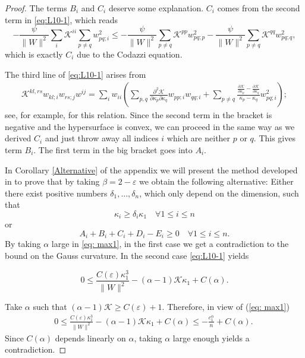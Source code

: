 \documentclass{amsart}
\theoremstyle{definition}
\theoremstyle{remark}
\newtheorem{remark}[theorem]{Remark}
\numberwithin{equation}{section}
\begin{document}
\begin{proof}
The terms $B_i$ and $C_i$ deserve some explanation. $C_i$ comes from the second term in \eqref{eq:L10-1}, which reads
\[-\frac{\psi}{\|W\|^2}\sum_i\mathcal{K}^{ii}\sum_{p\neq q}w_{pq;i}^2\leq -\frac{\psi}{\|W\|^2}\sum_{p\neq q}\mathcal{K}^{pp}w_{pq;p}^2-\frac{\psi}{\|W\|^2}\sum_{p\neq q}\mathcal{K}^{qq}w_{pq;q}^2, \]
which is exactly $C_i$ due to the Codazzi equation.

The third line of \eqref{eq:L10-1} arises from
\begin{align*}
\mathcal{K}^{kl,rs}w_{kl;i}w_{rs;j}w^{ij}=\sum_i w_{ii}\left(\sum_{p,q}\frac{\partial^2\mathcal{K}}{\partial \kappa_p\partial\kappa_q}w_{pp;i}w_{qq;i}+\sum_{p\neq q}\frac{\frac{\partial\mathcal{K}}{\partial \kappa_p}-\frac{\partial\mathcal{K}}{\partial\kappa_q}}{\kappa_p-\kappa_q} w_{pq;i}^2\right);
\end{align*}
see, for example, \cite[Lemma~2.1.14]{Gerhardt:/2006} for this relation. Since the second term in the bracket is negative and the hypersurface is convex, we can proceed in the same way as we derived $C_i$ and just throw away all indices $i$ which are neither $p$ or $q$. This gives term $B_i$. The first term in the big bracket goes into $A_i$.


In Corollary \ref{Alternative} of the appendix we will present the method developed in \cite{Guan} to prove that by taking $\beta=2-\varepsilon$ we obtain the following alternative: Either there exist positive numbers $\delta_1,\dots,\delta_n$, which only depend on the dimension, such that
\[\kappa_i\geq \delta_i\kappa_1\quad\forall 1\leq i\leq n\]
or 
\[A_i+B_i+C_i+D_i-E_i\geq 0\quad\forall 1\leq i\leq n.\]
By taking $\alpha$ large in \eqref{eq: max1}, in the first case we get a contradiction to the bound on the Gauss curvature. In the second case \eqref{eq:L10-1} yields


\[0\leq \frac{C(\varepsilon)\kappa_1^3}{\|W\|^2}-(\alpha-1) \mathcal{K}\kappa_1
+C(\alpha).\]

Take $\alpha$ such that $ (\alpha-1) \mathcal{K}\geq C(\varepsilon)+1$. Therefore, in view of (\ref{eq: max1})
\begin{align}\label{x}
0\leq \frac{C(\varepsilon)\kappa_1^3}{\|W\|^2}-(\alpha-1) \mathcal{K}\kappa_1
+C(\alpha)\leq -\frac{c_1^{\alpha}}{n}+C(\alpha).\
\end{align}
Since $C(\alpha)$ depends linearly on $\alpha$, taking $\alpha$ large enough yields a contradiction.
\end{proof}
\end{document}
